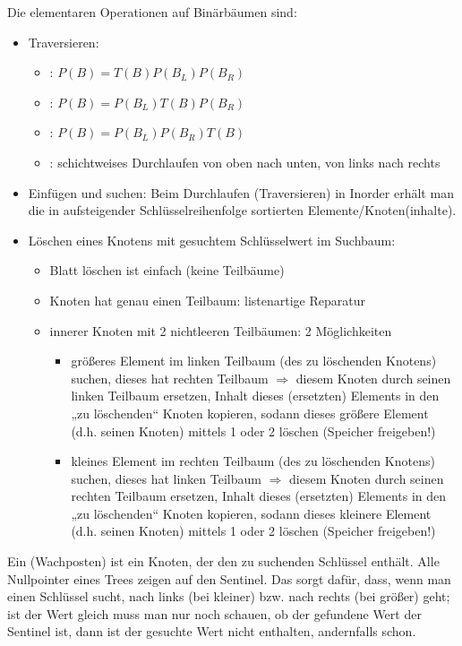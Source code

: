 Die elementaren Operationen auf Binärbäumen sind:
\begin{itemize}
	\item Traversieren:
	\begin{itemize}
		\item {}: $P(B)=T(B)P(B_L)P(B_R)$
		\item {}: $P(B)=P(B_L)T(B)P(B_R)$
		\item {}: $P(B)=P(B_L)P(B_R)T(B)$
		\item {}: schichtweises Durchlaufen von oben nach unten, von links nach rechts
	\end{itemize}
	\item Einfügen und suchen: Beim Durchlaufen (Traversieren) in Inorder erhält man die in aufsteigender Schlüsselreihenfolge sortierten Elemente/Knoten(inhalte).
	\item Löschen eines Knotens mit gesuchtem Schlüsselwert im Suchbaum:
	\begin{itemize}
		\item Blatt löschen ist einfach (keine Teilbäume)
		\item Knoten hat genau einen Teilbaum: listenartige Reparatur
		\item innerer Knoten mit 2 nichtleeren Teilbäumen: 2 Möglichkeiten
		\begin{itemize}
			\item größeres Element im linken Teilbaum (des zu löschenden Knotens) suchen, dieses hat rechten Teilbaum $\Rightarrow$ diesem Knoten durch seinen linken Teilbaum ersetzen, Inhalt dieses
			(ersetzten) Elements in den „zu löschenden“ Knoten kopieren, sodann dieses größere Element (d.h. seinen Knoten) mittels 1 oder 2 löschen (Speicher freigeben!)
			\item kleines Element im rechten Teilbaum (des zu löschenden Knotens) suchen, dieses hat linken Teilbaum $\Rightarrow$ diesem Knoten durch seinen rechten Teilbaum ersetzen, Inhalt dieses (ersetzten) Elements in den „zu löschenden“ Knoten kopieren, sodann dieses kleinere Element (d.h. seinen Knoten) mittels 1 oder 2 löschen (Speicher freigeben!)
		\end{itemize}
	\end{itemize}
\end{itemize}

Ein  (Wachposten) ist ein Knoten, der den zu suchenden Schlüssel enthält. Alle Nullpointer eines Trees zeigen auf den Sentinel. Das sorgt dafür, dass, wenn man einen Schlüssel sucht, nach links (bei kleiner) bzw. nach rechts (bei größer) geht; ist der Wert gleich muss man nur noch schauen, ob der gefundene Wert der Sentinel ist, dann ist der gesuchte Wert nicht enthalten, andernfalls schon.